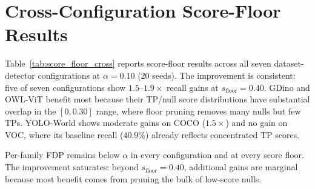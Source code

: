 \documentclass{article}
\theoremstyle{remark}
\newcommand{\1}{\mathbf{1}}
\begin{document}
\section{Cross-Configuration Score-Floor Results}
\label{app:score_floor_cross}

Table~\ref{tab:score_floor_cross} reports score-floor results across
all seven dataset-detector configurations at $\alpha=0.10$ (20 seeds).
The improvement is consistent: five of seven configurations show
$1.5$--$1.9\times$ recall gains at $s_{\mathrm{floor}}\!=\!0.40$.
GDino and OWL-ViT benefit most because their TP/null score distributions
have substantial overlap in the $[0,0.30]$ range, where floor pruning
removes many nulls but few TPs. YOLO-World shows moderate gains on
COCO ($1.5\times$) and no gain on VOC, where its baseline recall
($40.9\%$) already reflects concentrated TP scores.

Per-family FDP remains below $\alpha$ in every configuration and at
every score floor. The improvement saturates: beyond
$s_{\mathrm{floor}}\!=\!0.40$, additional gains are marginal because
most benefit comes from pruning the bulk of low-score nulls.
\end{document}
